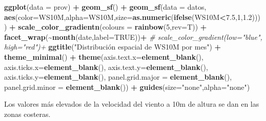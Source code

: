 \documentclass[12pt,a4paper,]{book}
\newenvironment{Shaded}{\begin{snugshade}}{\end{snugshade}}
\newcommand{\AttributeTok}[1]{\textcolor[rgb]{0.13,0.29,0.53}{#1}}
\newcommand{\CommentTok}[1]{\textcolor[rgb]{0.56,0.35,0.01}{\textit{#1}}}
\newcommand{\ConstantTok}[1]{\textcolor[rgb]{0.56,0.35,0.01}{#1}}
\newcommand{\DecValTok}[1]{\textcolor[rgb]{0.00,0.00,0.81}{#1}}
\newcommand{\FloatTok}[1]{\textcolor[rgb]{0.00,0.00,0.81}{#1}}
\newcommand{\FunctionTok}[1]{\textcolor[rgb]{0.13,0.29,0.53}{\textbf{#1}}}
\newcommand{\NormalTok}[1]{#1}
\newcommand{\SpecialCharTok}[1]{\textcolor[rgb]{0.81,0.36,0.00}{\textbf{#1}}}
\newcommand{\StringTok}[1]{\textcolor[rgb]{0.31,0.60,0.02}{#1}}
\numberwithin{dummy}{section}
\theoremstyle{ocrenumbox}
\theoremstyle{blacknumex}
\theoremstyle{blacknumbox}
\theoremstyle{ocrenum}
\theoremstyle{ocrenum}
\begin{document}
\begin{Shaded}
\begin{Highlighting}[]
\FunctionTok{ggplot}\NormalTok{(}\AttributeTok{data =}\NormalTok{ prov) }\SpecialCharTok{+} 
  \FunctionTok{geom\_sf}\NormalTok{() }\SpecialCharTok{+}
  \FunctionTok{geom\_sf}\NormalTok{(}\AttributeTok{data =}\NormalTok{ datos, }\FunctionTok{aes}\NormalTok{(}\AttributeTok{color=}\NormalTok{WS10M,}\AttributeTok{alpha=}\NormalTok{WS10M,}\AttributeTok{size=}\FunctionTok{as.numeric}\NormalTok{(}\FunctionTok{ifelse}\NormalTok{(WS10M}\SpecialCharTok{\textless{}}\FloatTok{7.5}\NormalTok{,}\DecValTok{1}\NormalTok{,}\FloatTok{1.2}\NormalTok{)))) }\SpecialCharTok{+}
  \FunctionTok{scale\_color\_gradientn}\NormalTok{(}\AttributeTok{colours =} \FunctionTok{rainbow}\NormalTok{(}\DecValTok{5}\NormalTok{,}\AttributeTok{rev=}\NormalTok{T)) }\SpecialCharTok{+}
  \FunctionTok{facet\_wrap}\NormalTok{(}\SpecialCharTok{\textasciitilde{}}\FunctionTok{month}\NormalTok{(date,}\AttributeTok{label=}\ConstantTok{TRUE}\NormalTok{))}\SpecialCharTok{+}
  \CommentTok{\# scale\_color\_gradient(low="blue", high="red")+}
  \FunctionTok{ggtitle}\NormalTok{(}\StringTok{"Distribución espacial de WS10M por mes"}\NormalTok{) }\SpecialCharTok{+}
  \FunctionTok{theme\_minimal}\NormalTok{() }\SpecialCharTok{+}
  \FunctionTok{theme}\NormalTok{(}\AttributeTok{axis.text.x=}\FunctionTok{element\_blank}\NormalTok{(),}
        \AttributeTok{axis.ticks.x=}\FunctionTok{element\_blank}\NormalTok{(),}
        \AttributeTok{axis.text.y=}\FunctionTok{element\_blank}\NormalTok{(),}
        \AttributeTok{axis.ticks.y=}\FunctionTok{element\_blank}\NormalTok{(),}
        \AttributeTok{panel.grid.major =} \FunctionTok{element\_blank}\NormalTok{(),}
        \AttributeTok{panel.grid.minor =} \FunctionTok{element\_blank}\NormalTok{()) }\SpecialCharTok{+}
  \FunctionTok{guides}\NormalTok{(}\AttributeTok{size=}\StringTok{"none"}\NormalTok{,}\AttributeTok{alpha=}\StringTok{"none"}\NormalTok{)}
\end{Highlighting}
\end{Shaded}

Los valores más elevados de la velocidad del viento a 10m de altura se
dan en las zonas costeras.
\end{document}
